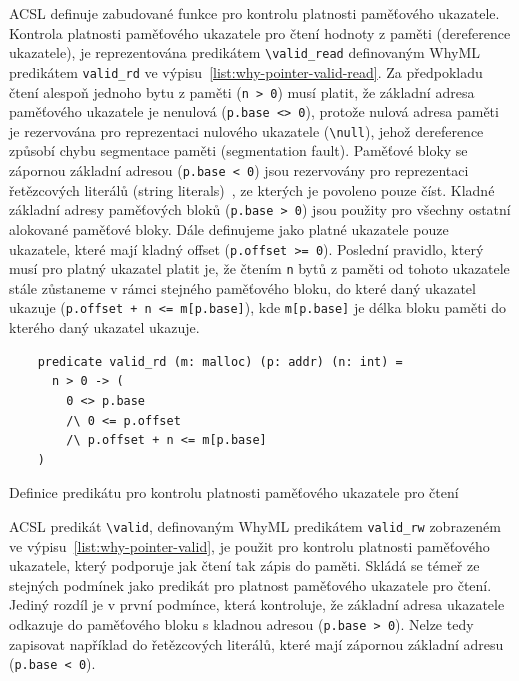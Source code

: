 ACSL definuje zabudované funkce pro kontrolu platnosti paměťového ukazatele.
Kontrola platnosti paměťového ukazatele pro čtení hodnoty z paměti (dereference ukazatele),
je reprezentována predikátem \texttt{\textbackslash valid\_read}
definovaným WhyML predikátem \texttt{valid\_rd} ve výpisu~\ref{list:why-pointer-valid-read}.
Za předpokladu čtení alespoň jednoho bytu z paměti (\texttt{n > 0}) musí platit,
že základní adresa paměťového ukazatele je nenulová (\texttt{p.base <> 0}),
protože nulová adresa paměti je rezervována pro reprezentaci nulového ukazatele (\texttt{\textbackslash null}),
jehož dereference způsobí chybu segmentace paměti (segmentation fault).
Paměťové bloky se zápornou základní adresou (\texttt{p.base < 0}) jsou rezervovány pro reprezentaci
řetězcových literálů (string literals)~\cite{ACSLSpec}, ze kterých je povoleno pouze číst.
Kladné základní adresy paměťových bloků (\texttt{p.base > 0}) jsou použity pro
všechny ostatní alokované paměťové bloky.
Dále definujeme jako platné ukazatele pouze ukazatele, které mají kladný offset (\texttt{p.offset >= 0}).
Poslední pravidlo, který musí pro platný ukazatel platit je,
že čtením \texttt{n} bytů z paměti od tohoto ukazatele stále zůstaneme v rámci stejného paměťového bloku,
do které daný ukazatel ukazuje (\texttt{p.offset + n <= m[p.base]}),
kde \texttt{m[p.base]} je délka bloku paměti do kterého daný ukazatel ukazuje.


\begin{listing}[H]
    \begin{verbatim}
    predicate valid_rd (m: malloc) (p: addr) (n: int) =
      n > 0 -> (
        0 <> p.base
        /\ 0 <= p.offset
        /\ p.offset + n <= m[p.base]
    )
    \end{verbatim}
    \caption{Definice predikátu pro kontrolu platnosti paměťového ukazatele pro čtení}
    \label{list:why-pointer-valid-read}
\end{listing}

ACSL predikát \texttt{\textbackslash valid},
definovaným WhyML predikátem \texttt{valid\_rw} zobrazeném ve výpisu~\ref{list:why-pointer-valid},
je použit pro kontrolu platnosti paměťového ukazatele,
který podporuje jak čtení tak zápis do paměti.
Skládá se témeř ze stejných podmínek jako predikát pro platnost paměťového ukazatele pro čtení.
Jediný rozdíl je v první podmínce, která kontroluje,
že základní adresa ukazatele odkazuje do paměťového bloku s kladnou adresou (\texttt{p.base > 0}).
Nelze tedy zapisovat například do řetězcových literálů,
které mají zápornou základní adresu (\texttt{p.base < 0}).

